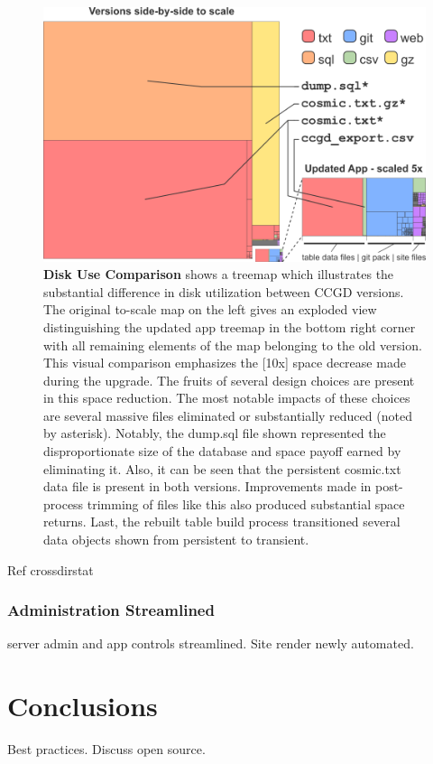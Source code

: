 \documentclass[10pt]{report}
\begin{document}
\begin{figure}[H]
    \centering
    \includegraphics[width=\textwidth]{fig/space_tree.png}
\caption[Disk Use Comparison]{\textbf{Disk Use Comparison} shows a treemap which illustrates the substantial difference in disk utilization between CCGD versions. The original to-scale map on the left gives an exploded view distinguishing the updated app treemap in the bottom right corner with all remaining elements of the map belonging to the old version. This visual comparison emphasizes the [10x] space decrease made during the upgrade. The fruits of several design choices are present in this space reduction. The most notable impacts of these choices are several massive files eliminated or substantially reduced (noted by asterisk). Notably, the dump.sql file shown represented the disproportionate size of the database and space payoff earned by eliminating it. Also, it can be seen that the persistent cosmic.txt data file is present in both versions. Improvements made in post-process trimming of files like this also produced substantial space returns. Last, the rebuilt table build process transitioned several data objects shown from persistent to transient.}\label{fig:spaceTree}
\end{figure}

Ref crossdirstat

\subsection{Administration Streamlined}
server admin and app controls streamlined. Site render newly automated.




\chapter{Conclusions}

Best practices. Discuss open source.

\printbibliography{}
\end{document}
